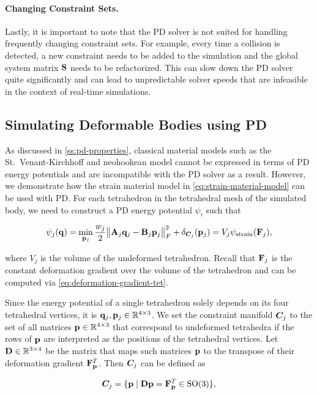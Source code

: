 \paragraph{Changing Constraint Sets.}
Lastly, it is important to note that the PD solver is not suited for handling frequently changing constraint sets. For example, every time 
a collision is detected, a new constraint needs to be added to the simulation and the global system matrix $\mathbf{S}$ needs
to be refactorized. This can slow down the PD solver quite significantly and can lead to unpredictable solver speeds that are infeasible in the
context of real-time simulations.

\subsection{Simulating Deformable Bodies using PD}\label{ss:pd-deformable-bodies}
As discussed in \cref{ss:pd-properties}, classical material models such as the St.\ Venant-Kirchhoff and neohookean model cannot be expressed in 
terms of PD energy potentials and are incompatible with the PD solver as a result. However, we demonstrate how the strain material model in 
\autoref{eq:strain-material-model} can be used with PD. For each tetrahedron in the tetrahedral mesh of the simulated body, we need to 
construct a PD energy potential $\psi_i$ such that 

\[
    \psi_j(\mathbf{q}) = \min_{\mathbf{p}_j} \frac{w_j}{2} \norm{\mathbf{A}_j\mathbf{q}_j - \mathbf{B}_j\mathbf{p}_j}^2_F + \delta_{\bm{C}_j}(\mathbf{p}_j)
    = V_j\psi_{\text{strain}}(\mathbf{F}_j),
\]

\noindent where $V_j$ is the volume of the undeformed tetrahedron. Recall that $\mathbf{F}_j$ is the constant deformation gradient over the volume 
of the tetrahedron and can be computed via \autoref{eq:deformation-gradient-tet}. 

Since the energy potential of a single tetrahedron solely depends on its four tetrahedral vertices, it 
is $\mathbf{q}_j, \mathbf{p}_j \in \mathbb{R}^{4 \times 3}$. We set the constraint manifold $\bm{C}_j$ to the set of all matrices $\mathbf{p} 
\in \mathbb{R}^{4 \times 3}$ that correspond to undeformed tetrahedra if the rows of $\mathbf{p}$ are interpreted as the positions of the 
tetrahedral vertices. Let $\mathbf{D} \in \mathbb{R}^{3 \times 4}$ be the matrix that maps such matrices $\mathbf{p}$ to the transpose of their deformation 
gradient $\mathbf{F}_\mathbf{p}^T$. Then $\bm{C}_j$ can be defined as

\begin{equation}\label{eq:pd-strain-constraint}
    \bm{C}_j = \{ \mathbf{p} \mid \mathbf{D}\mathbf{p} = \mathbf{F}_\mathbf{p}^T \in \text{SO}(3) \},
\end{equation}

